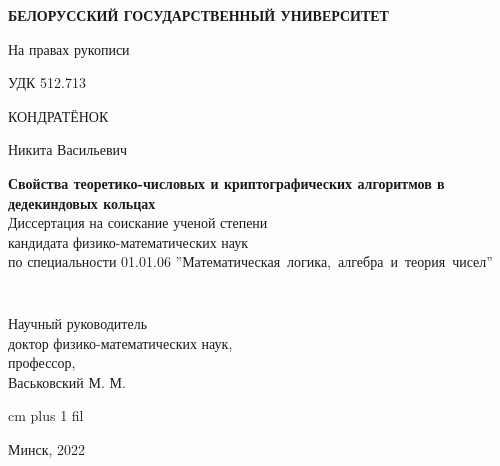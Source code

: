 \thispagestyle{empty}
\normalsize
\begin{center}
{\fontsize{16}{16}\selectfont \textbf{БЕЛОРУССКИЙ ГОСУДАРСТВЕННЫЙ УНИВЕРСИТЕТ}}
\end{center}
\vspace{4ex}
\normalsize

\noindent На правах рукописи\par
\noindent УДК 512.713 %

\normalsize
\begin{center}
\vspace{6ex}
{\fontsize{16}{16}\selectfont КОНДРАТЁНОК}

{\fontsize{16}{16}\selectfont Никита Васильевич}
\end{center}
\vspace{0ex}
\begin{center}
\large
\textbf{Свойства теоретико-числовых и криптографических алгоритмов в дедекиндовых кольцах}\\
\vspace{4ex}
{\fontsize{15}{15}\selectfont Диссертация на соискание ученой степени}\\
{\fontsize{15}{15}\selectfont кандидата физико-математических наук}\\
\vspace{2ex}
{\fontsize{15}{15}\selectfont по специальности 01.01.06 ''Математическая~логика,~алгебра~и~теория~чисел''}
\vspace{2ex}
\end{center}


\normalsize
\vspace{3ex}
\begin{minipage}{0.4\textwidth}
  \begin{flushleft}
$\,$\\
$\,$\\
$\,$\\
$\,$\\
\end{flushleft}
\end{minipage}
$\quad$
\begin{minipage}{0.5\textwidth}
  \begin{flushleft}
Научный руководитель\\
доктор физико-математических наук,\\
профессор,\\
Васьковский М. М.\\
  \end{flushleft}
\end{minipage}


 cm plus 1 fil
\begin{center}
Минск, 2022
\end{center}
\eject
